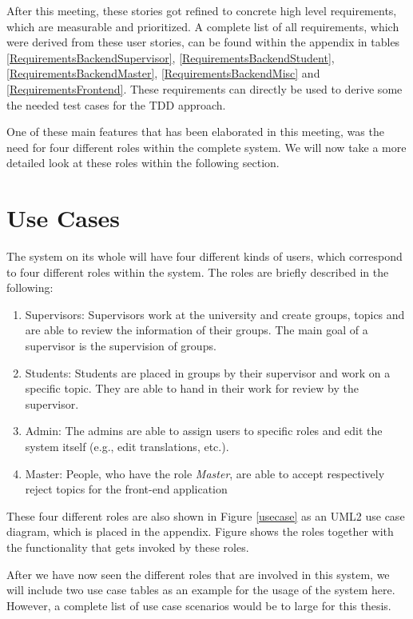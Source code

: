 After this meeting, these stories got refined to concrete high level requirements, which are measurable and prioritized. A complete list of all requirements, which were derived from these user stories, can be found within the appendix in tables \ref{RequirementsBackendSupervisor}, \ref{RequirementsBackendStudent}, \ref{RequirementsBackendMaster}, \ref{RequirementsBackendMisc} and \ref{RequirementsFrontend}. These requirements can directly be used to derive some the needed test cases for the \ac{TDD} approach.

One of these main features that has been elaborated in this meeting, was the need for four different roles within the complete system. We will now take a more detailed look at these roles within the following section.

\section{Use Cases}
The system on its whole will have four different kinds of users, which correspond to four different roles within the system. The roles are briefly described in the following:

\begin{enumerate}
	\item Supervisors: Supervisors work at the university and create groups, topics and are able to review the information of their groups. The main goal of a supervisor is the supervision of groups.
	\item Students: Students are placed in groups by their supervisor and work on a specific topic. They are able to hand in their work for review by the supervisor. 
	\item Admin: The admins are able to assign users to specific roles and edit the system itself (e.g., edit translations, etc.).
	\item Master: People, who have the role \textit{Master}, are able to accept respectively reject topics for the front-end application
\end{enumerate}

These four different roles are also shown in Figure \ref{usecase} as an \ac{UML2} use case diagram, which is placed in the appendix. Figure shows the roles together with the functionality that gets invoked by these roles. 	

After we have now seen the different roles that are involved in this system, we will include two use case tables as an example for the usage of the system here. However, a complete list of use case scenarios would be to large for this thesis.

